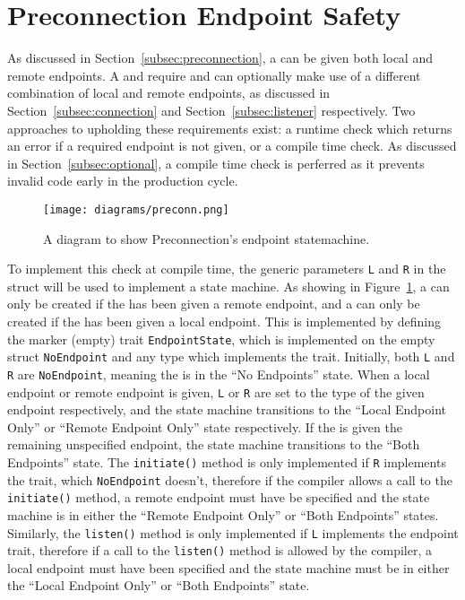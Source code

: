 \section{Preconnection Endpoint Safety}\label{sec:preconnection-endpoint-safety}
As discussed in Section~\ref{subsec:preconnection}, a \preconnection{} can be given both local and remote endpoints.
A \connection{} and \listener{} require and can optionally make use of a different combination of local
and remote endpoints, as discussed in Section~\ref{subsec:connection} and Section~\ref{subsec:listener} respectively.
Two approaches to upholding these requirements exist: a runtime check which returns an error if a required endpoint is
not given, or a compile time check.
As discussed in Section~\ref{subsec:optional}, a compile time check is perferred as it prevents invalid code early in
the production cycle.

\begin{figure}[h]
    \centering
    \texttt{[image: diagrams/preconn.png]}
    \caption{A diagram to show Preconnection's endpoint statemachine.}
    \label{fig:preconState}
\end{figure}

To implement this check at compile time, the generic parameters \texttt{L} and \texttt{R} in the \preconnection{} struct
will be used to implement a state machine.
As showing in Figure~\ref{fig:preconState}, a \connection{} can only be created if the \preconnection{} has been given
a remote endpoint, and a \listener{} can only be created if the \preconnection{} has been given a local endpoint.
This is implemented by defining the marker (empty) trait \texttt{EndpointState}, which is implemented on the empty
struct \texttt{NoEndpoint} and any type which implements the \Endpoint{} trait.
Initially, both \texttt{L} and \texttt{R} are \texttt{NoEndpoint}, meaning the \preconnection{} is in the “No Endpoints”
state.
When a local endpoint or remote endpoint is given, \texttt{L} or \texttt{R} are set to the type of the given endpoint
respectively, and the state machine transitions to the “Local Endpoint Only” or “Remote Endpoint Only” state
respectively.
If the \preconnection{} is given the remaining unspecified endpoint, the state machine transitions to the
“Both Endpoints” state.
The \texttt{initiate()} method is only implemented if \texttt{R} implements the \Endpoint{} trait, which
\texttt{NoEndpoint} doesn't, therefore if the compiler allows a call to the \texttt{initiate()} method, a remote
endpoint must have be specified and the state machine is in either the “Remote Endpoint Only” or “Both Endpoints”
states.
Similarly, the \texttt{listen()} method is only implemented if \texttt{L} implements the endpoint trait, therefore
if a call to the \texttt{listen()} method is allowed by the compiler, a local endpoint must have been specified and the
state machine must be in either the “Local Endpoint Only” or “Both Endpoints” state.

